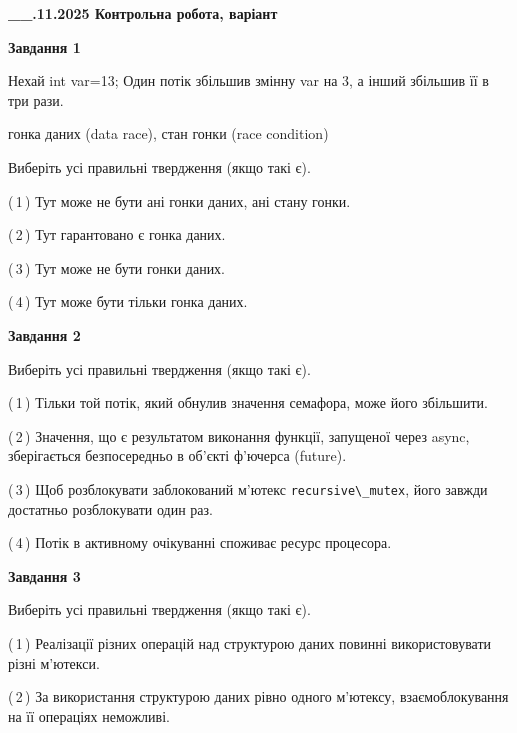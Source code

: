 \documentclass[12pt, ukrainian]{article}
\def\code#1{\Verb!#1!}
\begin{document}
\begin {large}

\textbf{\_\_.11.2025 Контрольна робота, варіант  }\par


{

\begin{center}
\textbf{Завдання 1}
\end{center}
Нехай int var=13; Один потік збільшив змінну var на 3, а інший збільшив її в три рази.

гонка даних (data race), стан гонки (race condition)

Виберіть усі правильні твердження (якщо такі є).\par
\vspace{2mm}
(\,1\,) Тут може не бути ані гонки даних, ані стану гонки.%

(\,2\,) Тут гарантовано є гонка даних.%

(\,3\,) Тут може не бути гонки даних.%

(\,4\,) Тут може бути тільки гонка даних.%



\begin{center}
\textbf{Завдання 2}
\end{center}
Виберіть усі правильні твердження (якщо такі є).\par
\vspace{2mm}

(\,1\,) Тільки той потік, який обнулив значення семафора, може його збільшити.%

(\,2\,) Значення, що є результатом виконання функції, запущеної через async, зберігається безпосередньо в об’єкті ф’ючерса (future).%

(\,3\,) Щоб розблокувати заблокований м’ютекс \code{recursive\_mutex}, його завжди достатньо розблокувати один раз.%

(\,4\,) Потік в активному очікуванні споживає ресурс процесора.%



\begin{center}
\textbf{Завдання 3}
\end{center}
Виберіть усі правильні твердження (якщо такі є).\par
\vspace{2mm}

(\,1\,) Реалізації різних операцій над структурою даних повинні використовувати різні м’ютекси.%

(\,2\,) За використання структурою даних рівно одного м’ютексу, взаємоблокування на її операціях неможливі.%

}
\end{large}
\end{document}
